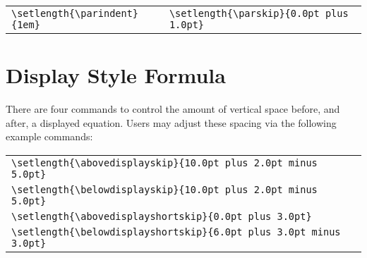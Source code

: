 \begin{tabular}{@{}ll@{}}
    \verb|\setlength{\parindent}{1em}| &
    \verb|\setlength{\parskip}{0.0pt plus 1.0pt}|
\end{tabular}

\section{Display Style Formula}

There are four commands to control the amount of vertical space before, and after, a displayed equation. Users may adjust these spacing via the following example commands:

\begin{tabular}{l}
    \verb|\setlength{\abovedisplayskip}{10.0pt plus 2.0pt minus 5.0pt}| \\
    \verb|\setlength{\belowdisplayskip}{10.0pt plus 2.0pt minus 5.0pt}| \\
    \verb|\setlength{\abovedisplayshortskip}{0.0pt plus 3.0pt}| \\
    \verb|\setlength{\belowdisplayshortskip}{6.0pt plus 3.0pt minus 3.0pt}|
\end{tabular}
